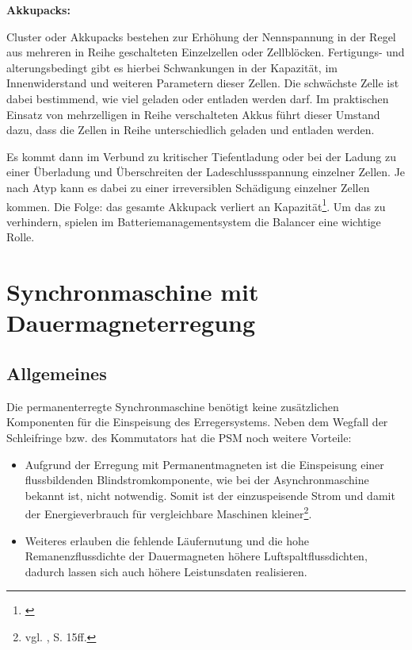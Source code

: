 \textbf{Akkupacks:}

 Cluster oder Akkupacks bestehen zur Erhöhung der Nennspannung in der Regel aus mehreren in Reihe geschalteten Einzelzellen oder Zellblöcken. Fertigungs- und alterungsbedingt gibt es hierbei Schwankungen in der Kapazität, im Innenwiderstand und weiteren Parametern dieser Zellen. Die schwächste Zelle ist dabei bestimmend, wie viel geladen oder entladen werden darf. Im praktischen Einsatz von mehrzelligen in Reihe verschalteten Akkus führt dieser Umstand dazu, dass die Zellen in Reihe unterschiedlich geladen und entladen werden.

Es kommt dann im Verbund zu kritischer Tiefentladung oder bei der Ladung zu einer Überladung und Überschreiten der Ladeschlussspannung einzelner Zellen. Je nach Atyp kann es dabei zu einer irreversiblen Schädigung einzelner Zellen kommen. Die Folge: das gesamte Akkupack verliert an Kapazität\footnote{\cite{BalancingderPacks}}. 
Um das zu verhindern, spielen im Batteriemanagementsystem die Balancer eine wichtige Rolle.

\newpage

\section{Synchronmaschine mit Dauermagneterregung}
\subsection{Allgemeines}
Die permanenterregte Synchronmaschine benötigt keine zusätzlichen Komponenten für die Einspeisung des Erregersystems. Neben dem Wegfall der Schleifringe bzw. des Kommutators hat die PSM noch weitere Vorteile:
\\[5mm]
\begin{itemize}
	\item Aufgrund der Erregung mit Permanentmagneten ist die Einspeisung einer flussbildenden Blindstromkomponente, wie bei der Asynchronmaschine bekannt ist, nicht notwendig. Somit ist der einzuspeisende Strom und damit der Energieverbrauch für vergleichbare Maschinen kleiner\footnote{vgl. \cite{Dissertation}, S. 15ff.}. \\[3mm]
	\item Weiteres erlauben die fehlende Läufernutung und die hohe Remanenzflussdichte der Dauermagneten höhere Luftspaltflussdichten, dadurch lassen sich auch höhere Leistunsdaten realisieren. \\[3mm]
\end{itemize}

